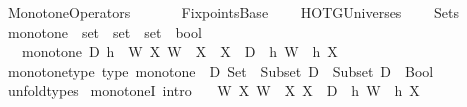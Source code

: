 %
\begin{isabellebody}%
%
%
\isadelimdocument
%
\endisadelimdocument
%
\isatagdocument
\isanewline
%
\isamarkuptrue%
%
\endisatagdocument
{\isafolddocument}%
%
\isadelimdocument
%
\endisadelimdocument
%
\isadelimtheory
%
\endisadelimtheory
%
\isatagtheory
{}\isamarkupfalse%
\ Monotone{\isacharunderscore}{\kern0pt}Operators\isanewline
\ \ \isanewline
\ \ \ \ Fixpoints{\isacharunderscore}{\kern0pt}Base\isanewline
\ \ \ \ HOTG{\isachardot}{\kern0pt}Universes\isanewline
\ \ \ \ Sets\isanewline
{}%
\endisatagtheory
{\isafoldtheory}%
%
\isadelimtheory
\isanewline
%
\endisadelimtheory
\isanewline
{}\isamarkupfalse%
\ monotone\ {\isacharcolon}{\kern0pt}{\isacharcolon}{\kern0pt}\ {\isachardoublequoteopen}set\ {\isasymRightarrow}\ {\isacharparenleft}{\kern0pt}set\ {\isasymRightarrow}\ set{\isacharparenright}{\kern0pt}\ {\isasymRightarrow}\ bool{\isachardoublequoteclose}\isanewline
\ \ \ {\isachardoublequoteopen}monotone\ D\ h\ {\isasymequiv}\ {\isacharparenleft}{\kern0pt}{\isasymforall}W\ X{\isachardot}{\kern0pt}\ W\ {\isasymsubseteq}\ X\ {\isasymlongrightarrow}\ X\ {\isasymsubseteq}\ D\ {\isasymlongrightarrow}\ h\ W\ {\isasymsubseteq}\ h\ X{\isacharparenright}{\kern0pt}{\isachardoublequoteclose}\isanewline
\isanewline
{}\isamarkupfalse%
\ monotone{\isacharunderscore}{\kern0pt}type\ {\isacharbrackleft}{\kern0pt}type{\isacharbrackright}{\kern0pt}{\isacharcolon}{\kern0pt}\ {\isachardoublequoteopen}monotone\ {\isacharcolon}{\kern0pt}\ {\isacharparenleft}{\kern0pt}D{\isacharcolon}{\kern0pt}\ Set{\isacharparenright}{\kern0pt}\ {\isasymRightarrow}\ {\isacharparenleft}{\kern0pt}Subset\ D\ {\isasymRightarrow}\ Subset\ D{\isacharparenright}{\kern0pt}\ {\isasymRightarrow}\ Bool{\isachardoublequoteclose}\isanewline
%
\isadelimproof
\ \ %
\endisadelimproof
%
\isatagproof
{}\isamarkupfalse%
\ unfold{\isacharunderscore}{\kern0pt}types%
\endisatagproof
{\isafoldproof}%
%
\isadelimproof
\isanewline
%
\endisadelimproof
\isanewline
{}\isamarkupfalse%
\ monotoneI\ {\isacharbrackleft}{\kern0pt}intro{\isacharbang}{\kern0pt}{\isacharbrackright}{\kern0pt}{\isacharcolon}{\kern0pt}\isanewline
\ \ \ {\isachardoublequoteopen}{\isasymAnd}W\ X{\isachardot}{\kern0pt}\ {\isasymlbrakk}W\ {\isasymsubseteq}\ X{\isacharsemicolon}{\kern0pt}\ X\ {\isasymsubseteq}\ D{\isasymrbrakk}\ {\isasymLongrightarrow}\ h\ W\ {\isasymsubseteq}\ h\ X{\isachardoublequoteclose}\isanewline

\end{isabellebody}
